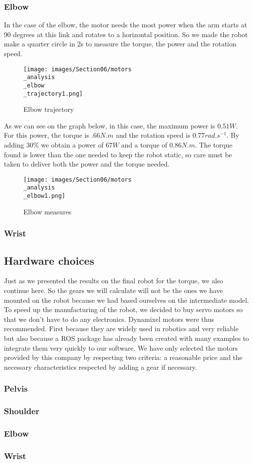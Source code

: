\subsubsection{Elbow}

In the case of the elbow, the motor needs the most power when the arm starts at 90 degrees at this link and rotates to a horizontal position. So we made the robot make a quarter circle in 2s to measure the torque, the power and the rotation speed.

\begin{figure}[ht]
    \centering
    \texttt{[image: images/Section06/motors\\\_analysis\\\_elbow\\\_trajectory1.png]}
    \caption{Elbow trajectory}
    \label{fig:mesh15}
\end{figure}
\FloatBarrier

As we can see on the graph below, in this case, the maximum power is $0.51W$. For this power, the torque is $.66N.m$ and the rotation speed is $0.77rad.s^{-1}$. By adding 30\% we obtain a power of $67W$ and a torque of $0.86N.m$. The torque found is lower than the one needed to keep the robot static, so care must be taken to deliver both the power and the torque needed.
\begin{figure}[ht]
    \centering
    \texttt{[image: images/Section06/motors\\\_analysis\\\_elbow1.png]}
    \caption{Elbow measures}
    \label{fig:mesh15}
\end{figure}
\FloatBarrier

\subsubsection{Wrist}


\subsection{Hardware choices}

Just as we presented the results on the final robot for the torque, we also continue here. So the gears we will calculate will not be the ones we have mounted on the robot because we had based ourselves on the intermediate model. To speed up the manufacturing of the robot, we decided to buy servo motors so that we don't have to do any electronics. Dynamixel motors were thus recommended. First because they are widely used in robotics and very reliable but also because a ROS package has already been created with many examples to integrate them very quickly to our software. We have only selected the motors provided by this company by respecting two criteria: a reasonable price and the necessary characteristics respected by adding a gear if necessary.

\subsubsection{Pelvis}

\subsubsection{Shoulder}

\subsubsection{Elbow}

\subsubsection{Wrist}

